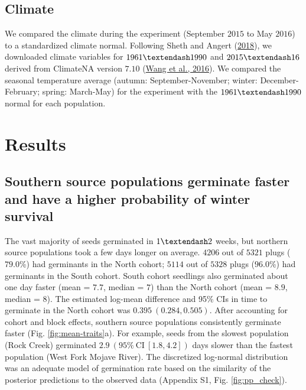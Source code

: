 \documentclass[
  12pt,
]{article}
\begin{document}
\hypertarget{climate}{%
\subsection{Climate}\label{climate}}

We compared the climate during the experiment (September \(2015\) to May \(2016\)) to a standardized climate normal. Following Sheth and Angert (\protect\hyperlink{ref-sheth_demographic_2018}{2018}), we downloaded climate variables for \(1961 \textendash 1990\) and \(2015 \textendash 16\) derived from ClimateNA version \(7.10\) (\protect\hyperlink{ref-wang_locally_2016}{Wang et al., 2016}). We compared the seasonal temperature average (autumn: September-November; winter: December-February; spring: March-May) for the experiment with the \(1961 \textendash 1990\) normal for each population.

\hypertarget{results}{%
\section{Results}\label{results}}

\hypertarget{southern-source-populations-germinate-faster-and-have-a-higher-probability-of-winter-survival}{%
\subsection{Southern source populations germinate faster and have a higher probability of winter survival}\label{southern-source-populations-germinate-faster-and-have-a-higher-probability-of-winter-survival}}

The vast majority of seeds germinated in \(1 \textendash 2\) weeks, but northern source populations took a few days longer on average. \(4206\) out of \(5321\) plugs (\(79.0\)\%) had germinants in the North cohort; \(5114\) out of \(5328\) plugs (\(96.0\)\%) had germinants in the South cohort. South cohort seedlings also germinated about one day faster (mean = \(7.7\), median = \(7\)) than the North cohort (mean = \(8.9\), median = \(8\)). The estimated log-mean difference and 95\% CIs in time to germinate in the North cohort was \(0.395~(0.284, 0.505)\). After accounting for cohort and block effects, southern source populations consistently germinate faster (Fig. \ref{fig:mean-traits}a). For example, seeds from the slowest population (Rock Creek) germinated \(2.9~(95\%~\text{CI}~[1.8,4.2])\) days slower than the fastest population (West Fork Mojave River). The discretized log-normal distribution was an adequate model of germination rate based on the similarity of the posterior predictions to the observed data (Appendix S1, Fig. \ref{fig:pp_check}).
\end{document}
